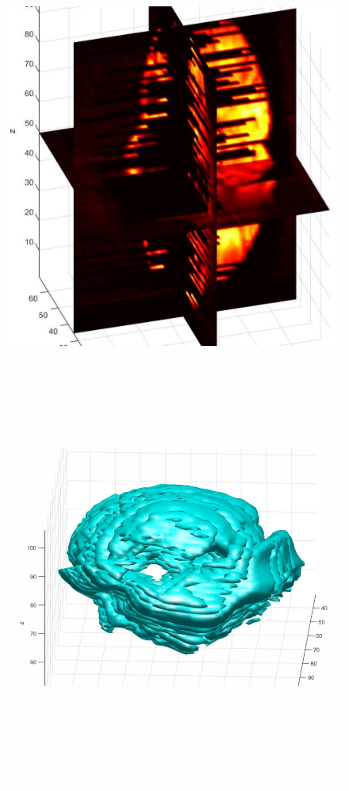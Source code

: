\documentclass{UCF_ETD}
\begin{document}
\begin{figure}[H]
\begin{center}
\includegraphics[scale=0.2]{RobustRegistration/3DNoisyVolumeInputSlices}
\includegraphics[scale=0.34]{RobustRegistration/3DNoisyVolumeSurface}

\end{center}
\end{figure}
\end{document}
